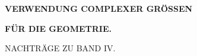 \clearpage{}
\thispagestyle{empty}
\vspace*{4cm}
\begin{center}
\textbf{\Large VERWENDUNG COMPLEXER GRÖSSEN}\par\bigskip
\textbf{\Large FÜR DIE GEOMETRIE.}\par\bigskip
NACHTRÄGE ZU BAND IV.
\end{center}
\clearpage
